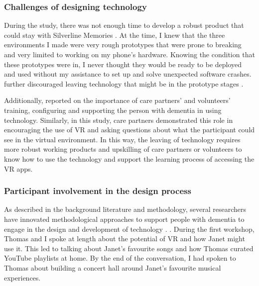 \subsubsection{Challenges of designing technology}
\label{S1:Robustness}
During the study, there was not enough time to develop a robust product that could stay with Silverline Memories . At the time, I knew that the three environments I made were very rough prototypes that were prone to breaking and very limited to working on my phone's hardware. Knowing the condition that these prototypes were in, I never thought they would be ready to be deployed and used without my assistance to set up and solve unexpected software crashes. \cite{hwang2020exploring} further discouraged leaving technology that might be in the prototype stages .

Additionally, \cite{hwang2020exploring} reported on the importance of care partners' and volunteers' training, configuring and supporting the person with dementia in using technology. Similarly, in this study, care partners demonstrated this role in encouraging the use of VR and asking questions about what the participant could see in the virtual environment. In this way, the leaving of technology requires more robust working products and upskilling of care partners or volunteers to know how to use the technology and support the learning process of accessing the VR apps. 

\subsubsection{Participant involvement in the design process}
\label{WhatExtentCo-design}
As described in the background literature and methodology, several researchers have innovated methodological approaches to support people with dementia to engage in the design and development of technology \citep{hendriks_challenges_2014, wallace_enabling_2012-1,lazar_critical_2017}. . During the first workshop, Thomas and I spoke at length about the potential of VR and how Janet might use it. This led to talking about Janet's favourite songs and how Thomas curated YouTube playlists at home. By the end of the conversation, I had spoken to Thomas about building a concert hall around Janet's favourite musical experiences.

